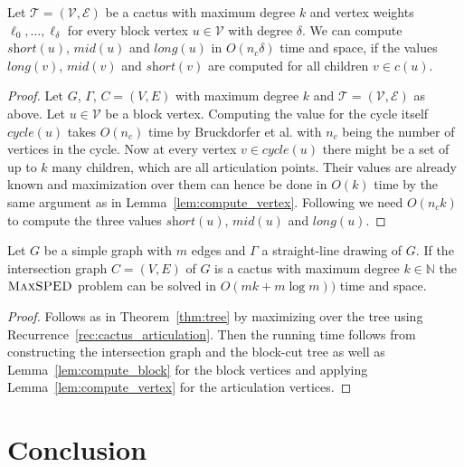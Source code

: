 \documentclass[a4paper,english,numberwithinsect]{eurocg18}
\newcommand{\maxsped}{\ensuremath{\textsc{MaxSPED}}\xspace}
\newcommand{\sollong}{\ensuremath{\textit{long}}\xspace}
\newcommand{\solmid}{\ensuremath{\textit{mid}}\xspace}
\newcommand{\solshort}{\ensuremath{\textit{short}}\xspace}
\begin{document}
\begin{lemma}
	\label{lem:compute_block}
	Let $ \mathcal T = (\mathcal V,\mathcal E) $ be a cactus with maximum degree $ k $ and vertex weights $ \ell_0,\dots,\ell_{\delta} $ for every block vertex $ u \in \mathcal V $ with degree $ \delta $. We can compute $ \solshort(u) $, $ \solmid(u) $ and $ \sollong(u) $ in $ O(n_c\delta) $ time and space, if the values $ \sollong(v) $, $ \solmid(v) $ and $ \solshort(v) $ are computed for all children $ v \in c(u) $.
\end{lemma}
\begin{proof}
	Let $ G $, $ \Gamma $,  $ C = (V,E) $ with maximum degree $ k $ and $ \mathcal T = (\mathcal V,\mathcal E) $ as above. Let $ u \in \mathcal V $ be a block vertex. Computing the value for the cycle itself $ \textit{cycle}(u) $ takes $ O(n_c) $ time by Bruckdorfer et al. with $ n_c $ being the number of vertices in the cycle. Now at every vertex $ v \in \textit{cycle}(u) $ there might be a set of up to $ k $ many children, which are all articulation points. Their values are already known and maximization over them can hence be done in $ O(k) $ time by the same argument as in Lemma~\ref{lem:compute_vertex}. Following we need $ O(n_ck) $ to compute the three values $ \solshort(u) $, $ \solmid(u) $ and $ \sollong(u) $.
\end{proof}

\begin{theorem}
	Let $ G $ be a simple graph with $m$ edges and $ \Gamma $ a straight-line drawing of $ G $. If the intersection graph $ C = (V,E) $ of $ G $ is a cactus with maximum degree $ k \in \mathbb{N} $ the \maxsped problem can be solved in $ O(mk + m \log m)) $ time and space.
\end{theorem}
\begin{proof}
	Follows as in Theorem~\ref{thm:tree} by maximizing over the tree using Recurrence~\ref{rec:cactus_articulation}. Then the running time follows from constructing the intersection graph and the block-cut tree as well as Lemma~\ref{lem:compute_block} for the block vertices and applying Lemma~\ref{lem:compute_vertex} for the articulation vertices.
\end{proof}




\section{Conclusion}



\end{document}
